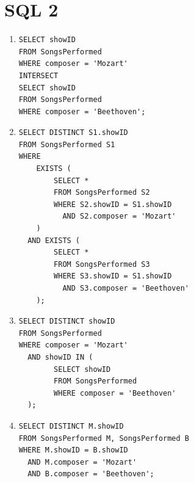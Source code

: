 \documentclass{article}
\begin{document}
\section*{SQL 2}

\begin{enumerate}
    \item \begin{verbatim}
SELECT showID
FROM SongsPerformed
WHERE composer = 'Mozart'
INTERSECT
SELECT showID
FROM SongsPerformed
WHERE composer = 'Beethoven';
    \end{verbatim}
    \item \begin{verbatim}
SELECT DISTINCT S1.showID
FROM SongsPerformed S1
WHERE 
    EXISTS (
        SELECT *
        FROM SongsPerformed S2
        WHERE S2.showID = S1.showID
          AND S2.composer = 'Mozart'
    )
  AND EXISTS (
        SELECT *
        FROM SongsPerformed S3
        WHERE S3.showID = S1.showID
          AND S3.composer = 'Beethoven'
    );
    \end{verbatim}
    \item \begin{verbatim}
SELECT DISTINCT showID
FROM SongsPerformed
WHERE composer = 'Mozart'
  AND showID IN (
        SELECT showID
        FROM SongsPerformed
        WHERE composer = 'Beethoven'
  );
    \end{verbatim}
    \item \begin{verbatim}
SELECT DISTINCT M.showID
FROM SongsPerformed M, SongsPerformed B
WHERE M.showID = B.showID
  AND M.composer = 'Mozart'
  AND B.composer = 'Beethoven';
    \end{verbatim}
\end{enumerate}
\end{document}

